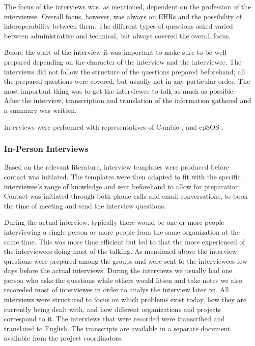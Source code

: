 \documentclass[14pt]{article}
\begin{document}
The focus of the interviews was, as mentioned, dependent on the profession of the interviewee. Overall focus, however, was always on \glspl{EHR} and the possibility of interoperability between them. The different types of questions asked varied between administrative and technical, but always covered the overall focus. 

Before the start of the interview it was important to make sure to be well prepared depending on the character of the interview and the interviewee. The interviews did not follow the structure of the questions prepared beforehand; all the prepared questions were covered, but usually not in any particular order. The most important thing was to get the interviewee to talk as much as possible. After the interview, transcription and translation of the information gathered and a summary was written.

Interviews were performed with representatives of Cambio \cite{Cambio}, and epSOS \cite{epSOS}.

\subsubsection{In-Person Interviews}

Based on the relevant literature, interview templates were produced before contact was initiated. The templates were then adapted to fit with the specific interviewee's range of knowledge and sent beforehand to allow for preparation. Contact was initiated through both phone calls and email conversations, to book the time of meeting and send the interview questions.

During the actual interview, typically there would be one or more people interviewing a single person or more people from the same organization at the same time. This was more time efficient but led to that the more experienced of the interviewees doing most of the talking. As mentioned above the interview questions were prepared among the groups and were sent to the interviewees few days before the actual interviews. During the interviews we usually had one person who asks the questions while others would litsen and take notes we also recoreded most of  interviewes in order to analys the interview later on. All interviews were structured to focus on which problems exist today, how they are currently being dealt with, and how different organizations and projects correspond to it. The interviews that were recorded were transcribed and translated to English. The transcripts are available in a separate document available from the project coordinators.
\end{document}
